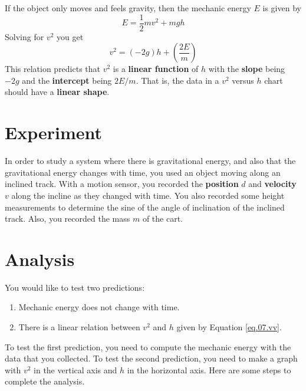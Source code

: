 If the object only moves and feels gravity, then the mechanic energy $E$ is given by
\begin{equation}
    E = \frac{1}{2} m v^{2} + m g h
\end{equation}
Solving for $v^{2}$ you get
\begin{equation}
    v^{2} = \left( - 2 g \right) h + \left( \frac{2 E}{m} \right)
    \label{eq.07.vv}
\end{equation}
This relation predicts that $v^{2}$ is a \textbf{linear function} of $h$ with the \textbf{slope} being $-2g$ and the \textbf{intercept} being $2 E / m$. That is, the data in a $v^{2}$ versus $h$ chart should have a \textbf{linear shape}.
%
\section{Experiment}
%
In order to study a system where there is gravitational energy, and also that the gravitational energy changes with time, you used an object moving along an inclined track. With a motion sensor, you recorded the \textbf{position} $d$ and \textbf{velocity} $v$ along the incline as they changed with time. You also recorded some height measurements to determine the sine of the angle of inclination of the inclined track. Also, you recorded the mass $m$ of the cart.
%
\section{Analysis}
%
You would like to test two predictions:
\begin{enumerate}
    \item Mechanic energy does not change with time.
    \item There is a linear relation between $v^{2}$ and $h$ given by Equation \ref{eq.07.vv}.
\end{enumerate}
To test the first prediction, you need to compute the mechanic energy with the data that you collected. To test the second prediction, you need to make a graph with $v^{2}$ in the vertical axis and $h$ in the horizontal axis. Here are some steps to complete the analysis.
%
